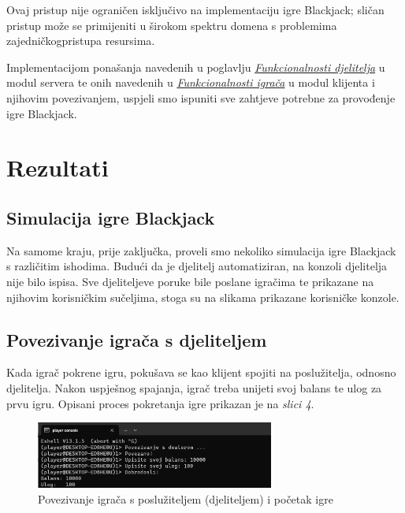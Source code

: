 \documentclass[conference]{IEEEtran}
\begin{document}
Ovaj pristup nije ograničen isključivo na implementaciju igre Blackjack; sličan pristup može se primijeniti u širokom spektru domena s problemima zajedničkog\break pristupa resursima. 

Implementacijom ponašanja navedenih u poglavlju \hyperref[sec:djelitelj]{\textit{Funkcionalnosti djelitelja}} u modul servera te onih navedenih u \hyperref[sec:igrac]{\textit{Funkcionalnosti igrača}} u modul klijenta i njihovim povezivanjem, uspjeli smo ispuniti sve zahtjeve potrebne za provođenje igre Blackjack.




\section{Rezultati}

\subsection{Simulacija igre Blackjack}

Na samome kraju, prije zaključka, proveli smo nekoliko simulacija igre Blackjack s različitim ishodima. Budući da je djelitelj automatiziran, na konzoli djelitelja nije bilo ispisa. Sve djeliteljeve poruke bile poslane igračima te prikazane na njihovim korisničkim sučeljima, stoga su na slikama prikazane korisničke konzole.

\subsection{Povezivanje igrača s djeliteljem}

Kada igrač pokrene igru, pokušava se kao klijent spojiti na poslužitelja, odnosno djelitelja. Nakon uspješnog spajanja, igrač treba unijeti svoj balans te ulog za prvu igru. Opisani proces pokretanja igre prikazan je na \textit{slici 4}.

\begin{figure}[H]
\centerline{\includegraphics[width=18.5pc]{1.jpeg}}
\caption{Povezivanje igrača s poslužiteljem (djeliteljem) i početak igre}
\vspace*{-5pt}
\end{figure}
\end{document}
